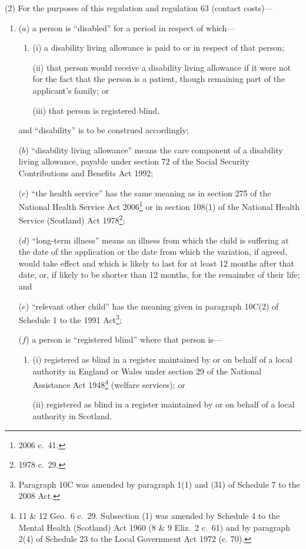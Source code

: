 \documentclass[12pt,a4paper]{article}
\begin{document}
(2) For the purposes of this regulation and regulation 63 (contact costs)—
\begin{enumerate}\item[]
($a$) a person is “disabled” for a period in respect of which—
\begin{enumerate}\item[]
(i) a disability living allowance is paid to or in respect of that person;

(ii) that person would receive a disability living allowance if it were not for the fact that the person is a patient, though remaining part of the applicant’s family; or

(iii) that person is registered blind,
\end{enumerate}
and “disability” is to be construed accordingly;

($b$) “disability living allowance” means the care component of a disability living allowance, payable under section 72 of the Social Security Contributions and Benefits Act 1992;

($c$) “the health service” has the same meaning as in section 275 of the National Health Service Act 2006\footnote{2006 c.~41.} or in section 108(1) of the National Health Service (Scotland) Act 1978\footnote{1978 c.~29.};

($d$) “long-term illness” means an illness from which the child is suffering at the date of the application or the date from which the variation, if agreed, would take effect and which is likely to last for at least 12 months after that date, or, if likely to be shorter than 12 months, for the remainder of their life; and

($e$) “relevant other child” has the meaning given in paragraph 10C(2) of Schedule 1 to the 1991 Act\footnote{Paragraph 10C was amended by paragraph 1(1) and (31) of Schedule 7 to the 2008 Act.};

($f$) a person is “registered blind” where that person is—
\begin{enumerate}\item[]
(i) registered as blind in a register maintained by or on behalf of a local authority in England or Wales under section 29 of the National Assistance Act 1948\footnote{11 \& 12 Geo.~6 c.~29. Subsection (1) was amended by Schedule 4 to the Mental Health (Scotland) Act 1960 (8 \& 9 Eliz.~2 c.~61) and by paragraph 2(4) of Schedule 23 to the Local Government Act 1972 (c. 70).} (welfare services); or

(ii) registered as blind in a register maintained by or on behalf of a local authority in Scotland.
\end{enumerate}
\end{enumerate}
\end{document}
